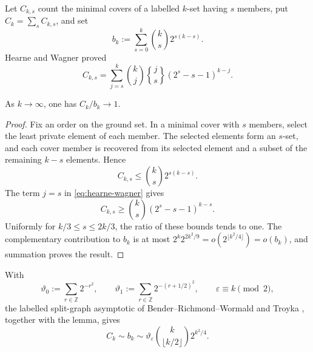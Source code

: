 Let $C_{k,s}$ count the minimal covers of a labelled $k$-set having $s$
members, put $C_k=\sum_s C_{k,s}$, and set
\[
 b_k:=\sum_{s=0}^k\binom{k}{s}2^{s(k-s)}.
\]
Hearne and Wagner \cite{HearneWagner1973MinimalCovers} proved
\begin{equation}\label{eq:hearne-wagner}
 C_{k,s}=\sum_{j=s}^k\binom{k}{j}
 \genfrac{\{}{\}}{0pt}{}{j}{s}(2^s-s-1)^{k-j}.
\end{equation}

\begin{lemma}
\label{lem:labelled-minimal-cover-comparison}
As $k\to\infty$, one has $C_k/b_k\to1$.
\end{lemma}

\begin{proof}
Fix an order on the ground set.  In a minimal cover with $s$ members, select
the least private element of each member.  The selected elements form an
$s$-set, and each cover member is recovered from its selected element and a
subset of the remaining $k-s$ elements.  Hence
\[
 C_{k,s}\leq\binom{k}{s}2^{s(k-s)}.
\]
The term $j=s$ in \eqref{eq:hearne-wagner} gives
\[
 C_{k,s}\geq\binom{k}{s}(2^s-s-1)^{k-s}.
\]
Uniformly for $k/3\leq s\leq2k/3$, the ratio of these bounds tends to one.
The complementary contribution to $b_k$ is at most
$2^k2^{2k^2/9}=o(2^{\lfloor k^2/4\rfloor})=o(b_k)$, and summation proves
the result.
\end{proof}

With
\[
 \vartheta_0:=\sum_{r\in\mathbb Z}2^{-r^2},\qquad
 \vartheta_1:=\sum_{r\in\mathbb Z}2^{-(r+1/2)^2},\qquad
 \varepsilon\equiv k\pmod2,
\]
the labelled split-graph asymptotic of
Bender--Richmond--Wormald and Troyka
\cite{BenderRichmondWormald1985ChordalSplit,Troyka2019SplitGraphs}, together
with the lemma, gives
\begin{equation}\label{eq:minimal-cover-theta}
 C_k\sim b_k\sim
 \vartheta_\varepsilon\binom{k}{\lfloor k/2\rfloor}2^{k^2/4}.
\end{equation}

